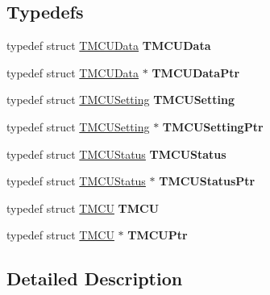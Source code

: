 \subsection*{Typedefs}
\begin{DoxyCompactItemize}
\item 
\hypertarget{group___mcu_strc_gae174830200efd00bac29d67bec1304e1}{typedef struct \hyperlink{struct_t_m_c_u_data}{T\-M\-C\-U\-Data} {\bfseries T\-M\-C\-U\-Data}}\label{group___mcu_strc_gae174830200efd00bac29d67bec1304e1}

\item 
\hypertarget{group___mcu_strc_gaf9f9e8319aa2b8f2156c0819b43f1826}{typedef struct \hyperlink{struct_t_m_c_u_data}{T\-M\-C\-U\-Data} $\ast$ {\bfseries T\-M\-C\-U\-Data\-Ptr}}\label{group___mcu_strc_gaf9f9e8319aa2b8f2156c0819b43f1826}

\item 
\hypertarget{group___mcu_strc_gac1f61665100e70edb09c92c771f53248}{typedef struct \hyperlink{struct_t_m_c_u_setting}{T\-M\-C\-U\-Setting} {\bfseries T\-M\-C\-U\-Setting}}\label{group___mcu_strc_gac1f61665100e70edb09c92c771f53248}

\item 
\hypertarget{group___mcu_strc_ga468c9539a1fd8a7e56344572e16ed361}{typedef struct \hyperlink{struct_t_m_c_u_setting}{T\-M\-C\-U\-Setting} $\ast$ {\bfseries T\-M\-C\-U\-Setting\-Ptr}}\label{group___mcu_strc_ga468c9539a1fd8a7e56344572e16ed361}

\item 
\hypertarget{group___mcu_strc_ga81b9504b36a50ce363405111363318d5}{typedef struct \hyperlink{struct_t_m_c_u_status}{T\-M\-C\-U\-Status} {\bfseries T\-M\-C\-U\-Status}}\label{group___mcu_strc_ga81b9504b36a50ce363405111363318d5}

\item 
\hypertarget{group___mcu_strc_gabd1476be7984765ce5f8055333a5ce36}{typedef struct \hyperlink{struct_t_m_c_u_status}{T\-M\-C\-U\-Status} $\ast$ {\bfseries T\-M\-C\-U\-Status\-Ptr}}\label{group___mcu_strc_gabd1476be7984765ce5f8055333a5ce36}

\item 
\hypertarget{group___mcu_strc_gadb794babeb45a99bbf391401f7a2cb47}{typedef struct \hyperlink{struct_t_m_c_u}{T\-M\-C\-U} {\bfseries T\-M\-C\-U}}\label{group___mcu_strc_gadb794babeb45a99bbf391401f7a2cb47}

\item 
\hypertarget{group___mcu_strc_ga50a3d9cf25267bb9e8b5fe8f2af62ec0}{typedef struct \hyperlink{struct_t_m_c_u}{T\-M\-C\-U} $\ast$ {\bfseries T\-M\-C\-U\-Ptr}}\label{group___mcu_strc_ga50a3d9cf25267bb9e8b5fe8f2af62ec0}

\end{DoxyCompactItemize}


\subsection{Detailed Description}

